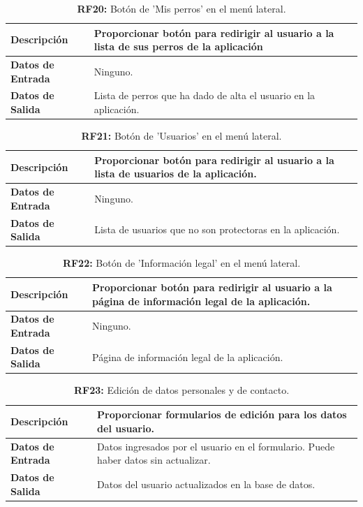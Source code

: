 \documentclass[a4paper, 12pt]{article}
\begin{document}
\begin{table}[H]
\captionsetup{justification=raggedright,singlelinecheck=false}
\caption{\textbf{RF20:} Botón de 'Mis perros' en el menú lateral.}
\label{tab:RF20}
	\begin{tabular}{|m{5cm}|m{10cm}|}
	\hline
	\textbf{Descripción} & Proporcionar botón para redirigir al usuario a la lista de sus perros de la aplicación \\ 
	\hline
	\textbf{Datos de Entrada} &  Ninguno. \\ 
	\hline
	\textbf{Datos de Salida} &  Lista de perros que ha dado de alta el usuario en la aplicación. \\ 
	\hline
\end{tabular}
\end{table}

\begin{table}[H]
\captionsetup{justification=raggedright,singlelinecheck=false}
\caption{\textbf{RF21:} Botón de 'Usuarios' en el menú lateral.}
\label{tab:RF21}
	\begin{tabular}{|m{5cm}|m{10cm}|}
	\hline
	\textbf{Descripción} & Proporcionar botón para redirigir al usuario a la lista de usuarios de la aplicación. \\ 
	\hline
	\textbf{Datos de Entrada} &  Ninguno. \\ 
	\hline
	\textbf{Datos de Salida} &  Lista de usuarios que no son protectoras en la aplicación. \\ 
	\hline
\end{tabular}
\end{table}

\begin{table}[H]
\captionsetup{justification=raggedright,singlelinecheck=false}
\caption{\textbf{RF22:} Botón de 'Información legal' en el menú lateral.}
\label{tab:RF22}
	\begin{tabular}{|m{5cm}|m{10cm}|}
	\hline
	\textbf{Descripción} & Proporcionar botón para redirigir al usuario a la página de información legal de la aplicación. \\ 
	\hline
	\textbf{Datos de Entrada} &  Ninguno. \\ 
	\hline
	\textbf{Datos de Salida} &  Página de información legal de la aplicación. \\ 
	\hline
\end{tabular}
\end{table}

\begin{table}[H]
\captionsetup{justification=raggedright,singlelinecheck=false}
\caption{\textbf{RF23:} Edición de datos personales y de contacto.}
\label{tab:RF23}
	\begin{tabular}{|m{5cm}|m{10cm}|}
	\hline
	\textbf{Descripción} & Proporcionar formularios de edición para los datos del usuario. \\ 
	\hline
	\textbf{Datos de Entrada} & Datos ingresados por el usuario en el formulario. Puede haber datos sin actualizar. \\ 
	\hline
	\textbf{Datos de Salida} &  Datos del usuario actualizados en la base de datos. \\ 
	\hline
\end{tabular}
\end{table}
\end{document}
